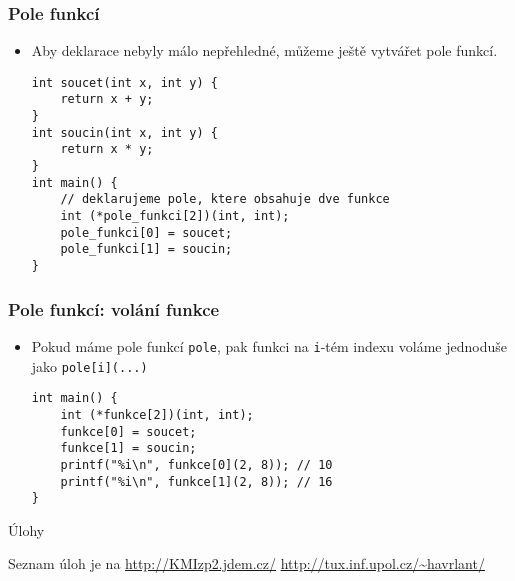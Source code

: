 \documentclass{beamer}
\newenvironment{itemizex}%
  {\large \begin{itemize}%
    \setlength{\itemsep}{8pt}%
    \setlength{\parskip}{8pt}}%
  {\end{itemize}}
\begin{document}
\begin{frame}[t,fragile]\frametitle{Pole funkcí} 
    \begin{itemizex}
        \item Aby deklarace nebyly málo nepřehledné, můžeme ještě vytvářet pole funkcí. 
\begin{verbatim} 
int soucet(int x, int y) {
    return x + y;
}
int soucin(int x, int y) {
    return x * y;
}
int main() {
    // deklarujeme pole, ktere obsahuje dve funkce
    int (*pole_funkci[2])(int, int); 
    pole_funkci[0] = soucet;
    pole_funkci[1] = soucin;
}
\end{verbatim}
    \end{itemizex}
\end{frame}


\begin{frame}[t,fragile]\frametitle{Pole funkcí: volání funkce} 
    \begin{itemizex}
        \item Pokud máme pole funkcí \texttt{pole}, pak funkci na \texttt{i}-tém indexu voláme jednoduše jako \texttt{pole[i](...)}
\begin{verbatim} 
int main() {
    int (*funkce[2])(int, int);
    funkce[0] = soucet;
    funkce[1] = soucin;
    printf("%i\n", funkce[0](2, 8)); // 10
    printf("%i\n", funkce[1](2, 8)); // 16
}
\end{verbatim}
    \end{itemizex}
\end{frame}


\begin{frame}[t,fragile]{Úlohy}
\begin{center}
\vskip 1cm
{\Large Seznam úloh je na \url{http://KMIzp2.jdem.cz/}}
\vskip 2cm
\url{http://tux.inf.upol.cz/~havrlant/}
\end{center}
\end{frame}
\end{document}
